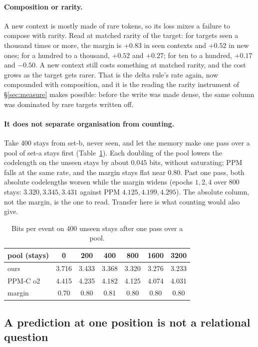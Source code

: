 \documentclass[11pt,a4paper]{article}
\theoremstyle{plain}
\theoremstyle{definition}
\theoremstyle{remark}
\begin{document}
\paragraph{Composition or rarity.} A new context is mostly made of rare
tokens, so its loss mixes a failure to compose with rarity. Read at matched
rarity of the target: for targets seen a thousand times or more, the margin is
$+0.83$ in seen contexts and $+0.52$ in new ones; for a hundred to a thousand,
$+0.52$ and $+0.27$; for ten to a hundred, $+0.17$ and $-0.50$. A new context
still costs something at matched rarity, and the cost grows as the target gets
rarer. That is the delta rule's rate again, now compounded with composition,
and it is the reading the rarity instrument of \S\ref{sec:measure} makes
possible: before the write was made dense, the same column was dominated by
rare targets written off.

\paragraph{It does not separate organisation from counting.} Take 400 stays
from set-b, never seen, and let the memory make one pass over a pool of
set-a stays first (Table~\ref{tab:pool}). Each doubling of the pool lowers the
codelength on the unseen stays by about $0.045$ bits, without saturating; PPM
falls at the same rate, and the margin stays flat near $0.80$. Past one pass,
both absolute codelengths worsen while the margin widens (epochs $1,2,4$ over
800 stays: $3.320, 3.345, 3.431$ against PPM $4.125, 4.199, 4.295$). The absolute
column, not the margin, is the one to read. Transfer here is what counting
would also give.

\begin{table}[h]
\centering
\small
\begin{tabular}{lcccccc}
\toprule
pool (stays) & 0 & 200 & 400 & 800 & 1600 & 3200\\
\midrule
ours & 3.716 & 3.433 & 3.368 & 3.320 & 3.276 & 3.233\\
PPM-C o2 & 4.415 & 4.235 & 4.182 & 4.125 & 4.074 & 4.031\\
margin & 0.70 & 0.80 & 0.81 & 0.80 & 0.80 & 0.80\\
\bottomrule
\end{tabular}
\caption{Bits per event on 400 unseen stays after one pass over a pool.}
\label{tab:pool}
\end{table}

\subsection{A prediction at one position is not a relational question}
\end{document}
